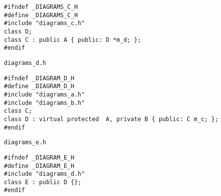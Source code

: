 \begin{VerbInclude}\begin{verbatim}#ifndef _DIAGRAMS_C_H
#define _DIAGRAMS_C_H
#include "diagrams_c.h"
class D;
class C : public A { public: D *m_d; };
#endif
\end{verbatim}
\end{VerbInclude}
 {\tt diagrams\_\-d.h} 

\begin{VerbInclude}\begin{verbatim}#ifndef _DIAGRAM_D_H
#define _DIAGRAM_D_H
#include "diagrams_a.h"
#include "diagrams_b.h"
class C;
class D : virtual protected  A, private B { public: C m_c; };
#endif
\end{verbatim}
\end{VerbInclude}
 {\tt diagrams\_\-e.h} 

\begin{VerbInclude}\begin{verbatim}#ifndef _DIAGRAM_E_H
#define _DIAGRAM_E_H
#include "diagrams_d.h"
class E : public D {};
#endif
\end{verbatim}
\end{VerbInclude}




 